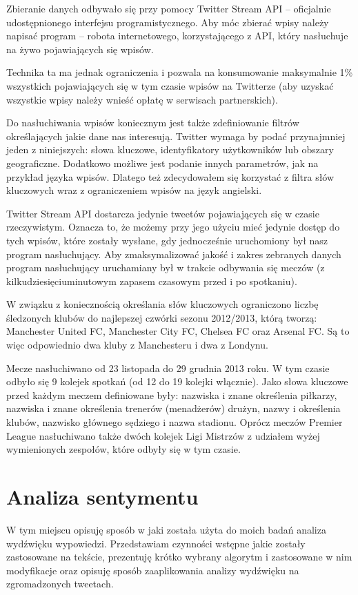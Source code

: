 Zbieranie danych odbywało się przy pomocy Twitter Stream API -- oficjalnie
udostępnionego interfejsu programistycznego.
Aby móc zbierać wpisy należy napisać program -- robota internetowego,
korzystającego z API, który nasłuchuje na żywo pojawiających się wpisów.

Technika ta ma jednak ograniczenia i pozwala na konsumowanie maksymalnie 1\%
wszystkich pojawiających się w tym czasie wpisów na Twitterze (aby uzyskać
wszystkie wpisy należy wnieść opłatę w serwisach partnerskich).

Do nasłuchiwania wpisów koniecznym jest także zdefiniowanie filtrów
określających jakie dane nas interesują. Twitter wymaga by podać przynajmniej
jeden z niniejszych: słowa kluczowe, identyfikatory użytkowników lub obszary
geograficzne. Dodatkowo możliwe jest podanie innych parametrów, jak na przykład
języka wpisów. Dlatego też zdecydowałem się korzystać z filtra słów kluczowych
wraz z ograniczeniem wpisów na język angielski.

Twitter Stream API dostarcza jedynie tweetów pojawiających się w czasie
rzeczywistym. Oznacza to, że możemy przy jego użyciu mieć jedynie dostęp do tych
wpisów, które zostały wysłane, gdy jednocześnie uruchomiony był nasz program
nasłuchujący. Aby zmaksymalizować jakość i zakres zebranych danych program
nasłuchujący uruchamiany był w trakcie odbywania się meczów 
(z kilkudziesięciuminutowym zapasem czasowym przed i po spotkaniu).

W związku z koniecznością określania słów kluczowych ograniczono liczbę
śledzonych klubów do najlepszej czwórki sezonu 2012/2013, którą tworzą:
Manchester United FC, Manchester City FC, Chelsea FC oraz Arsenal FC.
Są to więc odpowiednio dwa kluby z Manchesteru i dwa z Londynu.

Mecze nasłuchiwano od 23 listopada do 29 grudnia 2013 roku. W tym czasie odbyło
się 9 kolejek spotkań (od 12 do 19 kolejki włącznie). Jako słowa kluczowe przed
każdym meczem definiowane były: nazwiska i znane określenia
piłkarzy, nazwiska i znane określenia trenerów (menadżerów) drużyn, nazwy i
określenia klubów, nazwisko głównego sędziego i nazwa stadionu. 
Oprócz meczów Premier League nasłuchiwano także dwóch kolejek Ligi Mistrzów
z udziałem wyżej wymienionych zespołów, które odbyły się w tym czasie.

\clearpage
\section{Analiza sentymentu}
\label{section:analizasentymentu}
W tym miejscu opisuję sposób w jaki została użyta do moich badań analiza
wydźwięku wypowiedzi. Przedstawiam czynności wstępne jakie zostały zastosowane
na tekście, prezentuję krótko wybrany algorytm i zastosowane w nim modyfikacje
oraz opisuję sposób zaaplikowania analizy wydźwięku na zgromadzonych tweetach.

